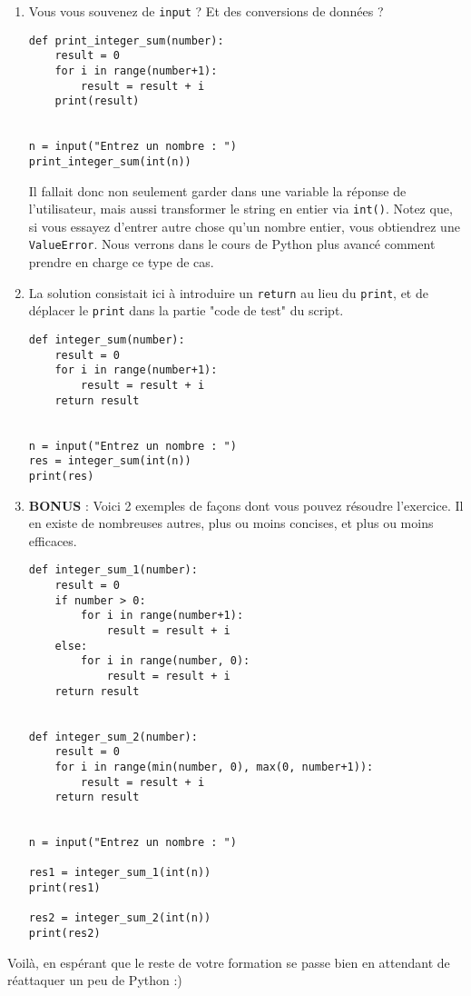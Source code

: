 \documentclass[12pt,a4paper]{article}
\newcommand{\codeintext}[1]{\texttt{#1}}
\begin{document}
\begin{enumerate}
\item Vous vous souvenez de \codeintext{input} ? Et des conversions de données ?

\begin{lstlisting}
def print_integer_sum(number):
    result = 0
    for i in range(number+1):
        result = result + i
    print(result)


n = input("Entrez un nombre : ")
print_integer_sum(int(n))
\end{lstlisting}

Il fallait donc non seulement garder dans une variable la réponse de l'utilisateur, mais aussi transformer le string en entier via \codeintext{int()}. Notez que, si vous essayez d'entrer autre chose qu'un nombre entier, vous obtiendrez une \codeintext{ValueError}. Nous verrons dans le cours de Python plus avancé comment prendre en charge ce type de cas.

\item La solution consistait ici à introduire un \codeintext{return} au lieu du \codeintext{print}, et de déplacer le \codeintext{print} dans la partie "code de test" du script.

\begin{lstlisting}
def integer_sum(number):
    result = 0
    for i in range(number+1):
        result = result + i
    return result


n = input("Entrez un nombre : ")
res = integer_sum(int(n))
print(res)
\end{lstlisting}

\item \textbf{BONUS} : Voici 2 exemples de façons dont vous pouvez résoudre l'exercice. Il en existe de nombreuses autres, plus ou moins concises, et plus ou moins efficaces.

\begin{lstlisting}
def integer_sum_1(number):
    result = 0
    if number > 0:
        for i in range(number+1):
            result = result + i
    else:
        for i in range(number, 0):
            result = result + i
    return result


def integer_sum_2(number):
    result = 0
    for i in range(min(number, 0), max(0, number+1)):
        result = result + i
    return result


n = input("Entrez un nombre : ")

res1 = integer_sum_1(int(n))
print(res1)

res2 = integer_sum_2(int(n))
print(res2)
\end{lstlisting}

\end{enumerate}

Voilà, en espérant que le reste de votre formation se passe bien en attendant de réattaquer un peu de Python :)
\end{document}
